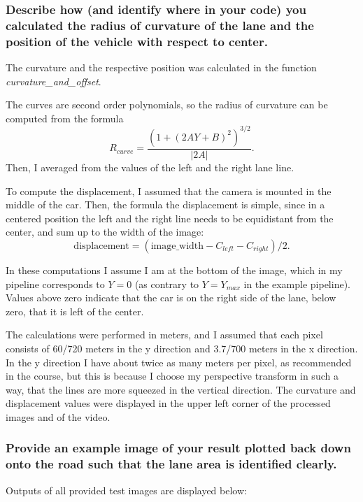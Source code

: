 \documentclass[a4paper,10pt]{article}
\begin{document}
\subsubsection{Describe how (and identify where in your code) you calculated the radius of curvature of the lane and the position of the vehicle with respect to center.}

The curvature and the respective position was calculated in the function \emph{curvature\_and\_offset}.

The curves are second order polynomials, so the radius of curvature can be computed from the formula 
%
$$
  R_{curve} = \frac{(1+(2AY+B)^2)^{3/2}}{|2A|}.
$$
%
Then, I averaged from the values of the left and the right lane line.


To compute the displacement, I assumed that the camera is mounted in the middle of the car.
Then, the formula the displacement is simple, since in a centered position the left and the right line needs to be equidistant from the center,
and sum up to the width of the image:
%
$$
 \text{displacement} = (\text{image\_width} - C_{left} - C_{right})/2.
$$

In these computations I assume I am at the bottom of the image, which in my pipeline corresponds to $Y=0$
(as contrary to $Y=Y_{max}$ in the example pipeline).
Values above zero indicate that the car is on the right side of the lane, below zero, that it is left of the center.

The calculations were performed in meters, and I assumed that each pixel consists of 60/720 meters in the y direction and 3.7/700 meters in the x direction.
In the y direction I have about twice as many meters per pixel, as recommended in the course, but this is because I choose my perspective transform
in such a way, that the lines are more squeezed in the vertical direction.
The curvature and displacement values were displayed in the upper left corner of the processed images and of the video.



\subsubsection{ Provide an example image of your result plotted back down onto the road such that the lane area is identified clearly.}

Outputs of all provided test images are displayed below:
\end{document}
